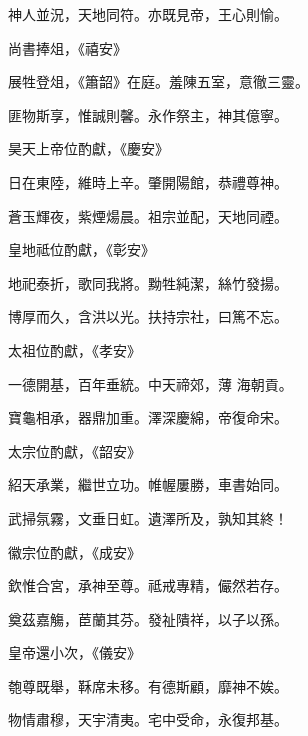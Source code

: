 \begin{pinyinscope}
 神人並況，天地同符。亦既見帝，王心則愉。



 尚書捧俎，《禧安》



 展牲登俎，《簫韶》在庭。羞陳五室，意徹三靈。



 匪物斯享，惟誠則馨。永作祭主，神其億寧。



 昊天上帝位酌獻，《慶安》



 日在東陸，維時上辛。肇開陽館，恭禮尊神。



 蒼玉輝夜，紫煙煬晨。祖宗並配，天地同禋。



 皇地祗位酌獻，《彰安》



 地祀泰折，歌同我將。黝牲純潔，絲竹發揚。



 博厚而久，含洪以光。扶持宗社，曰篤不忘。



 太祖位酌獻，《孝安》



 一德開基，百年垂統。中天禘郊，薄
 海朝貢。



 寶龜相承，器鼎加重。澤深慶綿，帝復命宋。



 太宗位酌獻，《韶安》



 紹天承業，繼世立功。帷幄屢勝，車書始同。



 武掃氛霧，文垂日虹。遺澤所及，孰知其終！



 徽宗位酌獻，《成安》



 欽惟合宮，承神至尊。祗戒專精，儼然若存。



 奠茲嘉觴，茞蘭其芬。發祉隤祥，以子以孫。



 皇帝還小次，《儀安》



 匏尊既舉，鞂席未移。有德斯顧，靡神不娭。



 物情肅穆，天宇清夷。宅中受命，永復邦基。




\end{pinyinscope}
